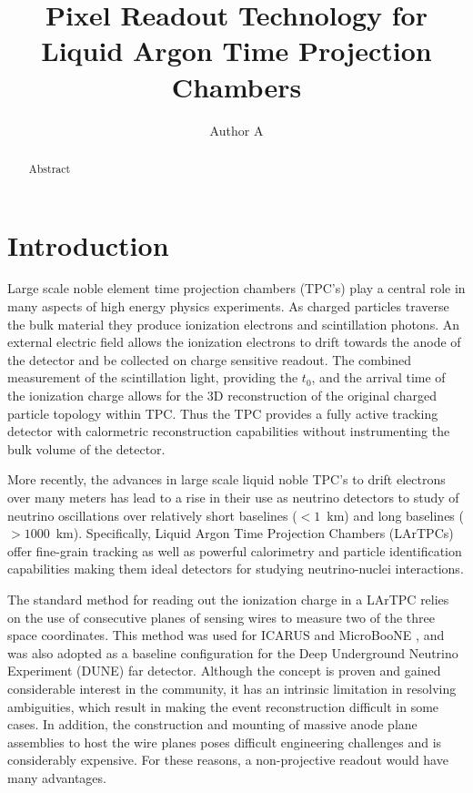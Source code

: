 \documentclass[reprint,amsmath,amssymb,aps,prl,superscriptaddress]{revtex4-1}
\begin{document}
\title{Pixel Readout Technology for Liquid Argon Time Projection Chambers}

\author{Author A}

\begin{abstract}
Abstract
\end{abstract}

\maketitle

\section{Introduction}\label{sec:intro}
Large scale noble element time projection chambers (TPC's) play a central role in many aspects of high energy physics experiments. As charged particles traverse the bulk material they produce ionization electrons and scintillation photons. An external electric field allows the ionization electrons to drift towards the anode of the detector and be collected on charge sensitive readout. The combined measurement of the scintillation light, providing the $t_0$, and the arrival time of the ionization charge allows for the 3D reconstruction of the original charged particle topology within TPC. Thus the TPC provides a fully active tracking detector with calormetric reconstruction capabilities without instrumenting the bulk volume of the detector.

More recently, the advances in large scale liquid noble TPC's to drift electrons over many meters has lead to a rise in their use as neutrino detectors to study of neutrino oscillations over relatively short baselines ($<1$~km) and long baselines ($>1000$~km). Specifically, Liquid Argon Time Projection Chambers (LArTPCs) \cite{TPC1, TPC2, TPC3} offer fine-grain tracking as well as powerful calorimetry and particle identification capabilities making them ideal detectors for studying neutrino-nuclei interactions. 

The standard method for reading out the ionization charge in a LArTPC relies on the use of consecutive planes of sensing wires to measure two of the three space coordinates. This method was used for ICARUS \cite{ICARUS} and MicroBooNE \cite{uBooNE}, and was also adopted as a baseline configuration for the Deep Underground Neutrino Experiment (DUNE) \cite{DUNE} far detector. Although the concept is proven and gained considerable interest in the community, it has an intrinsic limitation in resolving ambiguities, which result in making the event reconstruction difficult in some cases. In addition, the construction and mounting of massive anode plane assemblies to host the wire planes poses difficult engineering challenges and is considerably expensive. For these reasons, a non-projective readout would have many advantages. 
\end{document}
